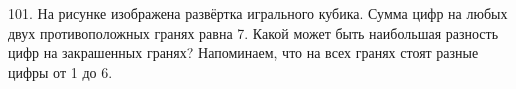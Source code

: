 101. На рисунке изображена развёртка игрального кубика. Сумма цифр на любых двух противоположных гранях равна 7. Какой может быть наибольшая разность цифр на закрашенных гранях? Напоминаем, что на всех гранях стоят разные цифры от 1 до 6.
\begin{center}
\begin{figure}[ht!]
\end{figure}
\end{center}
